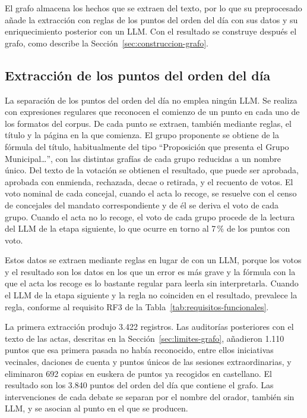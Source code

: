 \documentclass[11pt, a4paper]{report}
\begin{document}
	El grafo almacena los hechos que se extraen del texto, por lo que su
	preprocesado añade la extracción con reglas de los puntos del orden del día
	con sus datos y su enriquecimiento posterior con un LLM. Con el resultado se construye después el grafo, como describe la
	Sección~\ref{sec:construccion-grafo}.

	\subsection{Extracción de los puntos del orden del día}

	La separación de los puntos del orden del día no emplea ningún LLM. Se realiza
	con expresiones regulares que reconocen el comienzo de un punto en cada uno de
	los formatos del corpus. De cada punto se extraen, también mediante reglas,
	el título y la página en la que comienza. El grupo proponente se obtiene de
	la fórmula del título, habitualmente del tipo ``Proposición que presenta el
	Grupo Municipal\ldots'', con las distintas grafías de cada grupo
	reducidas a un nombre único. Del texto de la votación se obtienen el
	resultado, que puede ser aprobada, aprobada con enmienda, rechazada, decae o
	retirada, y el recuento de votos. El voto nominal de cada concejal, cuando
	el acta lo recoge, se resuelve con el censo de concejales del mandato
	correspondiente y de él se deriva el voto de cada grupo. Cuando el acta no lo recoge, el voto de cada
	grupo procede de la lectura del LLM de la etapa siguiente, lo que ocurre en
	torno al 7\,\% de los puntos con voto.

	Estos datos se extraen mediante reglas en lugar de con un LLM, porque los votos y el resultado son los datos en los que un error es más grave y la fórmula con la que el acta los recoge es lo bastante regular
	para leerla sin interpretarla. Cuando el LLM de la etapa siguiente y la regla
	no coinciden en el resultado, prevalece la regla, conforme al requisito RF3 de
	la Tabla~\ref{tab:requisitos-funcionales}.

	La primera extracción produjo 3.422 registros. Las auditorías posteriores con
	el texto de las actas, descritas en la Sección~\ref{sec:limites-grafo},
	añadieron 1.110 puntos que esa primera pasada no había reconocido, entre
	ellos iniciativas vecinales, daciones de cuenta y puntos únicos de las
	sesiones extraordinarias, y eliminaron 692 copias en euskera de puntos ya
	recogidos en castellano. El resultado son los 3.840 puntos del orden del día
	que contiene el grafo. Las intervenciones de cada debate se separan por el
	nombre del orador, también sin LLM, y se asocian al punto en el que se
	producen.
\end{document}

